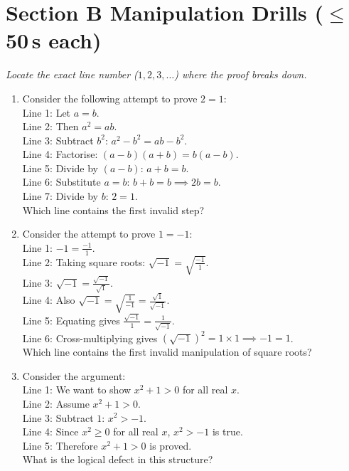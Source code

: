 \documentclass[11pt,a4paper]{article}
\begin{document}
\section*{Section B \quad Manipulation Drills \hfill{\normalfont\small($\leq$50\,s each)}}

\noindent\textit{Locate the exact line number ($1, 2, 3, \dots$) where the proof breaks down.}

\begin{enumerate}

\item Consider the following attempt to prove $2 = 1$:\\
Line 1: Let $a = b$.\\
Line 2: Then $a^2 = ab$.\\
Line 3: Subtract $b^2$: $a^2 - b^2 = ab - b^2$.\\
Line 4: Factorise: $(a-b)(a+b) = b(a-b)$.\\
Line 5: Divide by $(a-b)$: $a+b = b$.\\
Line 6: Substitute $a=b$: $b+b = b \implies 2b = b$.\\
Line 7: Divide by $b$: $2 = 1$.\\
Which line contains the first invalid step?

\item Consider the attempt to prove $1 = -1$:\\
Line 1: $-1 = \frac{-1}{1}$.\\
Line 2: Taking square roots: $\sqrt{-1} = \sqrt{\frac{-1}{1}}$.\\
Line 3: $\sqrt{-1} = \frac{\sqrt{-1}}{\sqrt{1}}$.\\
Line 4: Also $\sqrt{-1} = \sqrt{\frac{1}{-1}} = \frac{\sqrt{1}}{\sqrt{-1}}$.\\
Line 5: Equating gives $\frac{\sqrt{-1}}{1} = \frac{1}{\sqrt{-1}}$.\\
Line 6: Cross-multiplying gives $(\sqrt{-1})^2 = 1 \times 1 \implies -1 = 1$.\\
Which line contains the first invalid manipulation of square roots?

\item Consider the argument:\\
Line 1: We want to show $x^2 + 1 > 0$ for all real $x$.\\
Line 2: Assume $x^2 + 1 > 0$.\\
Line 3: Subtract $1$: $x^2 > -1$.\\
Line 4: Since $x^2 \ge 0$ for all real $x$, $x^2 > -1$ is true.\\
Line 5: Therefore $x^2 + 1 > 0$ is proved.\\
What is the logical defect in this structure?


\end{enumerate}
\end{document}
